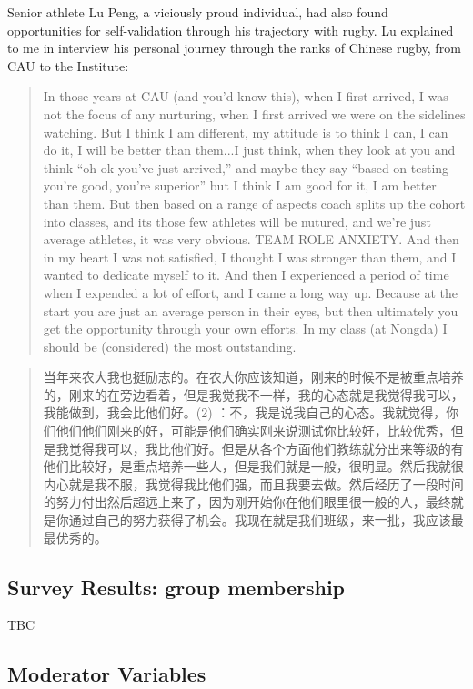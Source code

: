 \begin{CJK}{UTF8}{gbsn}
Senior athlete Lu Peng, a viciously proud individual, had also found opportunities for self-validation through his trajectory with rugby.  Lu explained to me in interview his personal journey through the ranks of Chinese rugby, from CAU to the Institute:

\begin{quotation}
    In those years at CAU (and you’d know this), when I first arrived, I was not the focus of any nurturing, when I first arrived we were on the sidelines watching.  But I think I am different, my attitude is to think I can, I can do it, I will be better than them...I just think, when they look at you and think ``oh ok you’ve just arrived,'' and maybe they say “based on testing you’re good, you’re superior” but I think I am good for it, I am better than them.  But then based on a range of aspects coach splits up the cohort into classes, and its those few athletes will be nutured, and we’re just average athletes, it was very obvious. TEAM ROLE ANXIETY. And then in my heart I was not satisfied, I thought I was stronger than them, and I wanted to dedicate myself to it.  And then I experienced a period of time when I expended a lot of effort, and I came a long way up.  Because at the start you are just an average person in their eyes, but then ultimately you get the opportunity through your own efforts. In my class (at Nongda) I should be (considered) the most outstanding.
\end{quotation}

    \begin{quotation}
    当年来农大我也挺励志的。在农大你应该知道，刚来的时候不是被重点培养的，刚来的在旁边看着，但是我觉我不一样，我的心态就是我觉得我可以，我能做到，我会比他们好。(2) ：不，我是说我自己的心态。我就觉得，你们他们他们刚来的好，可能是他们确实刚来说测试你比较好，比较优秀，但是我觉得我可以，我比他们好。但是从各个方面他们教练就分出来等级的有他们比较好，是重点培养一些人，但是我们就是一般，很明显。然后我就很内心就是我不服，我觉得我比他们强，而且我要去做。然后经历了一段时间的努力付出然后超远上来了，因为刚开始你在他们眼里很一般的人，最终就是你通过自己的努力获得了机会。我现在就是我们班级，来一批，我应该最最优秀的。
    \end{quotation}

\clearpage
\subsection{Survey Results: group membership}
TBC

\clearpage
\subsection{Moderator Variables}


\end{CJK}
